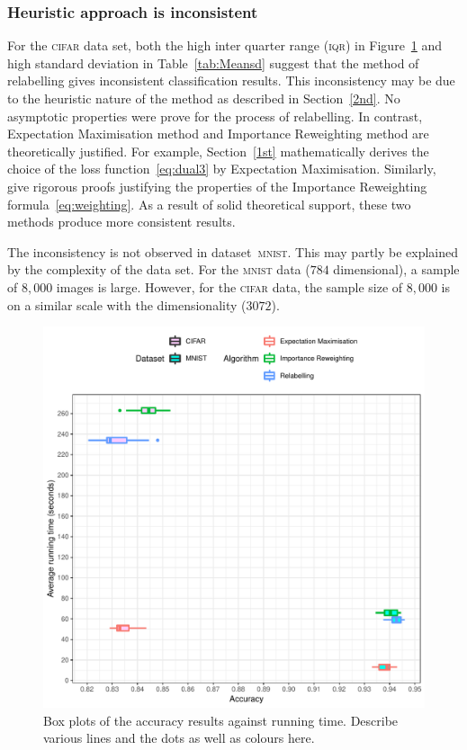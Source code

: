 \documentclass[12pt]{article} %
\begin{document}
\subsubsection{Heuristic approach is inconsistent}
For the \textsc{cifar} data set, both the high inter quarter range (\textsc{iqr}) in Figure~\ref{fig:Boxplot} and high standard deviation in Table~\ref{tab:Meansd} suggest that the method of relabelling gives inconsistent classification results. This inconsistency may be due to the heuristic nature of the method as described in  Section~\ref{2nd}. No asymptotic properties were prove for the process of relabelling. In contrast, Expectation Maximisation method and Importance Reweighting method are theoretically justified. For example, Section~\ref{1st} mathematically derives the choice of the loss function~\eqref{eq:dual3} by Expectation Maximisation. 
Similarly, \citet{liu2016classification} give rigorous proofs justifying the properties of the Importance Reweighting formula~\eqref{eq:weighting}. As a result of solid theoretical support, these two methods produce more consistent results.

The inconsistency is not observed in dataset~\textsc{mnist}. This may partly be explained by the complexity of the data set. For the \textsc{mnist} data ($784$ dimensional), a sample of $8,000$ images is large. However, for the \textsc{cifar} data, the sample size of $8,000$ is on a similar scale with the dimensionality ($3072$).
\begin{figure}    
	\centering
    \includegraphics[scale=0.8]{boxplot}%
	\caption{Box plots of the accuracy results against running time. {\color{red}Describe various lines and the dots as well as colours here. }
}
	\label{fig:Boxplot}
\end{figure}
\end{document}
